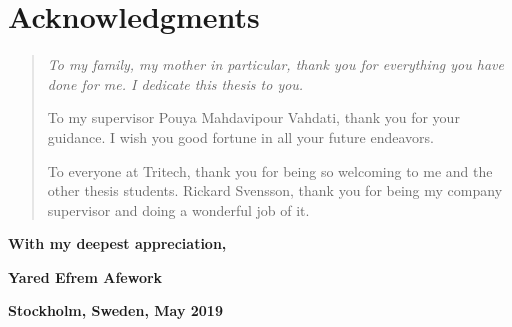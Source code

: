 {%
	\vspace*{\fill}%
	{%
		\section*{Acknowledgments}
		}
	
	\begin{quote}\itshape%
		To my family, my mother in particular, thank you for everything you have done for me. I dedicate this thesis to you.
		
		
		To my supervisor Pouya Mahdavipour Vahdati, thank you for your guidance. I wish you good fortune in all your future endeavors. %
		
		To everyone at Tritech, thank you for being so welcoming to me and the other thesis students. Rickard Svensson, thank you for being my company supervisor and doing a wonderful job of it.
		
		
	\end{quote}
	
	\hfill{} \textbf{With my deepest appreciation,}
	
	\hfill{} \textbf{Yared Efrem Afework}
	
	\hfill{} \textbf{Stockholm, Sweden, May 2019}
	
	\vspace*{\fill}
}

